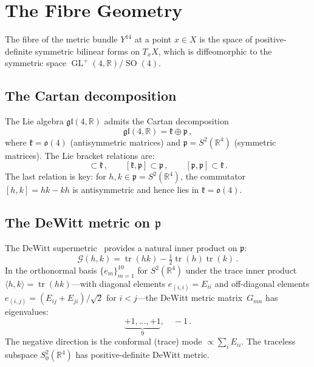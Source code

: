 \documentclass[12pt,a4paper]{article}
\theoremstyle{definition}
\newcommand{\tr}{\operatorname{tr}}
\newcommand{\GL}{\operatorname{GL}}
\newcommand{\SO}{\operatorname{SO}}
\newcommand{\R}{\mathbb{R}}
\begin{document}
\section{The Fibre Geometry}
\label{sec:fibre}

The fibre of the metric bundle $Y^{14}$ at a point $x \in X$ is the space of positive-definite symmetric bilinear forms on $T_xX$, which is diffeomorphic to the symmetric space $\GL^+(4,\R)/\SO(4)$.

\subsection{The Cartan decomposition}

The Lie algebra $\mathfrak{gl}(4,\R)$ admits the Cartan decomposition
\begin{equation}
\mathfrak{gl}(4,\R) = \mathfrak{k} \oplus \mathfrak{p}\,,
\end{equation}
where $\mathfrak{k} = \mathfrak{o}(4)$ (antisymmetric matrices) and $\mathfrak{p} = S^2(\R^4)$ (symmetric matrices).
The Lie bracket relations are:
\begin{equation}
[\mathfrak{k}, \mathfrak{k}] \subset \mathfrak{k}\,,\qquad
[\mathfrak{k}, \mathfrak{p}] \subset \mathfrak{p}\,,\qquad
[\mathfrak{p}, \mathfrak{p}] \subset \mathfrak{k}\,.
\end{equation}
The last relation is key: for $h, k \in \mathfrak{p} = S^2(\R^4)$, the commutator $[h,k] = hk - kh$ is antisymmetric and hence lies in $\mathfrak{k} = \mathfrak{o}(4)$.

\subsection{The DeWitt metric on \texorpdfstring{$\mathfrak{p}$}{p}}

The DeWitt supermetric~\cite{DeWitt1967} provides a natural inner product on $\mathfrak{p}$:
\begin{equation}
\label{eq:dewitt}
\mathcal{G}(h,k) = \tr(hk) - \tfrac{1}{2}\tr(h)\tr(k)\,.
\end{equation}
In the orthonormal basis $\{e_m\}_{m=1}^{10}$ for $S^2(\R^4)$ under the trace inner product $\langle h, k \rangle = \tr(hk)$---with diagonal elements $e_{(i,i)} = E_{ii}$ and off-diagonal elements $e_{(i,j)} = (E_{ij} + E_{ji})/\sqrt{2}$ for $i < j$---the DeWitt metric matrix~$G_{mn}$ has eigenvalues:
\begin{equation}
\underbrace{+1, \ldots, +1}_{9}, \quad -1\,.
\end{equation}
The negative direction is the conformal (trace) mode $\propto \sum_i E_{ii}$.
The traceless subspace $S^2_0(\R^4)$ has positive-definite DeWitt metric.
\end{document}
